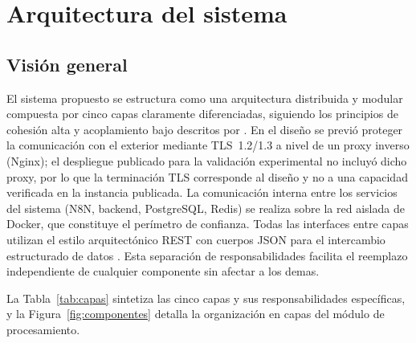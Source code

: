 \section{Arquitectura del sistema}\label{sec:arquitectura}

\subsection{Visión general}\label{subsec:vision-general}

El sistema propuesto se estructura como una arquitectura distribuida y modular compuesta por cinco capas claramente diferenciadas, siguiendo los principios de cohesión alta y acoplamiento bajo descritos por \textcite{Pressman2020_software_engineering}. En el diseño se previó proteger la comunicación con el exterior mediante TLS~1.2/1.3 a nivel de un proxy inverso (Nginx); el despliegue publicado para la validación experimental no incluyó dicho proxy, por lo que la terminación TLS corresponde al diseño y no a una capacidad verificada en la instancia publicada. La comunicación interna entre los servicios del sistema (N8N, backend, PostgreSQL, Redis) se realiza sobre la red aislada de Docker, que constituye el perímetro de confianza. Todas las interfaces entre capas utilizan el estilo arquitectónico REST con cuerpos JSON para el intercambio estructurado de datos \parencite{Fielding2002_rest}. Esta separación de responsabilidades facilita el reemplazo independiente de cualquier componente sin afectar a los demas.

La Tabla~\ref{tab:capas} sintetiza las cinco capas y sus responsabilidades específicas, y la Figura~\ref{fig:componentes} detalla la organización en capas del módulo de procesamiento.

